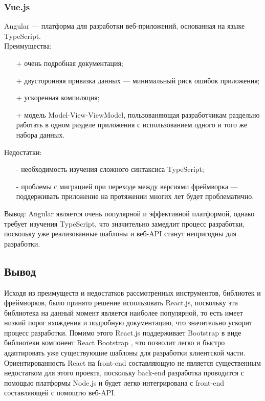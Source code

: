 \documentclass[a4paper,12pt]{article}
\begin{document}
\subsubsection{Vue.js}

Angular — платформа для разработки веб-приложений, основанная на языке TypeScript. \cite{website:medium}\\
Преимущества:
\begin{itemize}
	\item[+] очень подробная документация;
	\item[+] двусторонняя привазка данных — минимальный риск ошибок приложения;
	\item[+] ускоренная компиляция;
	\item[+] модель Model-View-ViewModel, пользованяющая разработчикам раздельно работать в одном разделе приложения с использованием одного и того же набора данных.
\end{itemize}

Недостатки:
\begin{itemize}
	\item[-] необходимость изучения сложного синтаксиса TypeScript;
	\item[-] проблемы с миграцией при переходе между версиями фреймворка — поддерживать приложение на протяжении многих лет будет проблематично.
\end{itemize}

Вывод: Angular является очень популярной и эффективной платформой, однако требует изучения TypeScript, что значительно замедлит процесс разработки, поскольку уже реализованные шаблоны и веб-API станут непригодны для разработки.\\

\subsection{Вывод}
Исходя из преимуществ и недостатков рассмотренных инструментов, библиотек и фреймворков, было принято решение использовать React.js, поскольку эта библиотека на данный момент является наиболее популярной, то есть имеет низкий порог вхождения и подробную документацию, что значительно ускорит процесс разработки. Помимо этого React.js поддерживает Bootstrap в виде библиотеки компонент React Bootstrap \cite{website:bootstrap}, что позволит легко и быстро адаптировать уже существующие шаблоны для разработки клиентской части. Ориентированность React на front-end составляющую не является существенным недостатком для этого проекта, поскольку back-end разработка проводится с помощью платформы Node.js и будет легко интегрирована с front-end составляющей с помощтю веб-API.\\
\end{document}
